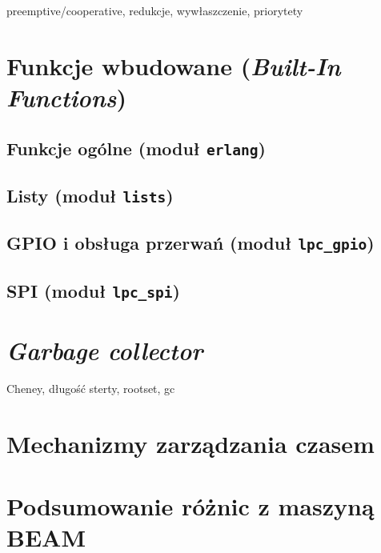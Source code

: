 preemptive/cooperative, redukcje, wywłaszczenie, priorytety

\section{Funkcje wbudowane (\emph{Built-In Functions})}
\label{sec:maszynaBIF}

\subsection{Funkcje ogólne (moduł \texttt{erlang})}
\label{sub:bifErlang}

\subsection{Listy (moduł \texttt{lists})}
\label{sub:bifLists}

\subsection{GPIO i obsługa przerwań (moduł \texttt{lpc\_gpio})}
\label{sub:bifGPIO}

\subsection{SPI (moduł \texttt{lpc\_spi})}
\label{sub:bifSPI}

\section{\emph{Garbage collector}}
\label{sec:maszynaGC}

Cheney, długość sterty, rootset, gc

\section{Mechanizmy zarządzania czasem}
\label{sec:maszynaTimer}

\section{Podsumowanie różnic z maszyną BEAM}
\label{sec:maszynaPodsumowanie}

